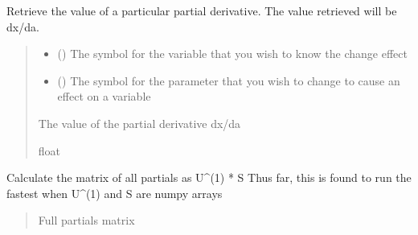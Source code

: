 \documentclass[letterpaper,10pt,english]{sphinxmanual}
\begin{document}
\begin{fulllineitems}
\begin{fulllineitems}
\label{\detokenize{src.sensitivity.faster_sensitivity:src.sensitivity.faster_sensitivity.SensitivityMatrix.get_partial}}
\pysigstartsignatures
\pysiglinewithargsret
{}
{\sphinxparamcomma {}}
{}
\pysigstopsignatures
\sphinxAtStartPar
Retrieve the value of a particular partial derivative.
The value retrieved will be dx/da.
\begin{quote}\begin{description}
\begin{itemize}
\item {} 
\sphinxAtStartPar
{} () \textendash{} The symbol for the variable that you wish to know the change effect

\item {} 
\sphinxAtStartPar
{} () \textendash{} The symbol for the parameter that you wish to change to cause an effect on a variable

\end{itemize}

\sphinxAtStartPar
The value of the partial derivative dx/da

\sphinxAtStartPar
float

\end{description}\end{quote}

\end{fulllineitems}


\begin{fulllineitems}
\label{\detokenize{src.sensitivity.faster_sensitivity:src.sensitivity.faster_sensitivity.SensitivityMatrix.get_partials_matrix}}
\pysigstartsignatures
\pysiglinewithargsret
{}
{}
{}
\pysigstopsignatures
\sphinxAtStartPar
Calculate the matrix of all partials as U\textasciicircum{}(\sphinxhyphen{}1) * S
Thus far, this is found to run the fastest when U\textasciicircum{}(\sphinxhyphen{}1) and S are numpy arrays
\begin{quote}\begin{description}
\sphinxAtStartPar
Full partials matrix


\end{description}
\end{quote}
\end{fulllineitems}
\end{fulllineitems}
\end{document}
